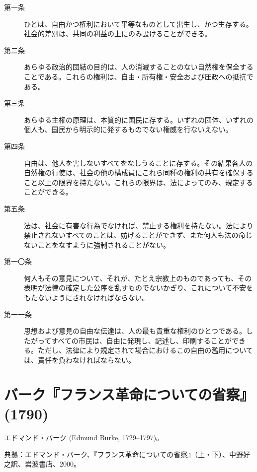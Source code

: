 \begin{description}



 \item[第一条] ひとは、自由かつ権利において平等なものとして出生し、かつ生存する。社会的差別は、共同の利益の上にのみ設けることができる。 

 \item[第二条] あらゆる政治的団結の目的は、人の消滅することのない自然権を保全することである。これらの権利は、自由・所有権・安全および圧政への抵抗である。

 \item[第三条] あらゆる主権の原理は、本質的に国民に存する。いずれの団体、いずれの個人も、国民から明示的に発するものでない権威を行ないえない。

 \item[第四条]自由は、他人を害しないすべてをなしうることに存する。その結果各人の自然権の行使は、社会の他の構成員にこれら同種の権利の共有を確保すること以上の限界を持たない。これらの限界は、法によってのみ、規定することができる。
 
 \item[第五条]法は、社会に有害な行為でなければ、禁止する権利を持たない。法により禁止されないすべてのことは、妨げることができず、また何人も法の命じないことをなすように強制されることがない。
 
 \item[第一〇条] 何人もその意見について、それが、たとえ宗教上のものであっても、その表明が法律の確定した公序を乱すものでないかぎり、これについて不安をもたないようにされなければならない。

 
 \item[第一一条] 思想および意見の自由な伝達は、人の最も貴重な権利のひとつである。したがってすべての市民は、自由に発現し、記述し、印刷することができる。ただし、法律により規定されて場合におけるこの自由の濫用については、責任を負わなければならない。


 \end{description}
 
\pagebreak{}
\section{バーク『フランス革命についての省察』(1790)}

エドマンド・バーク (Edmund Burke, 1729--1797)。

典拠：エドマンド・バーク、『フランス革命についての省察』（上・下）、中野好之訳、岩波書店、2000。


\subsection{}



